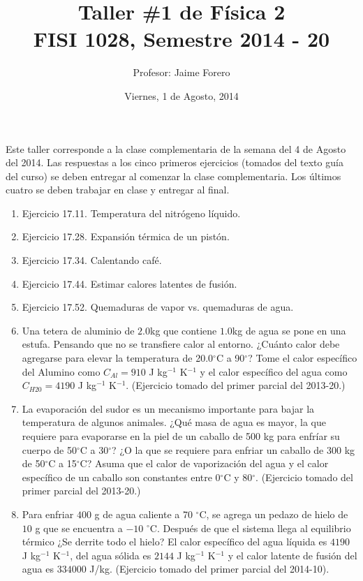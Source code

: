 \documentclass{article}
\title{Taller \#1 de F\'isica 2\\ FISI 1028, Semestre 2014 - 20}
\author{Profesor: Jaime Forero}
\date{Viernes, 1 de Agosto, 2014}
\begin{document}
\maketitle
\thispagestyle{empty}

\noindent
Este taller corresponde a la clase complementaria de la semana
del 4 de Agosto del 2014. Las respuestas a los cinco primeros
ejercicios (tomados del texto gu\'ia del curso) se deben entregar al
comenzar la clase complementaria. Los \'ultimos cuatro se deben
trabajar en clase y entregar al final. 

\begin{enumerate}
\item{Ejercicio 17.11. Temperatura del nitr\'ogeno l\'iquido.}

\item{Ejercicio 17.28. Expansi\'on t\'ermica de un pist\'on.} 

\item{Ejercicio 17.34. Calentando caf\'e.}

\item{Ejercicio 17.44. Estimar calores latentes de fusi\'on.}

\item{Ejercicio 17.52. Quemaduras de vapor vs. quemaduras de agua.} 


\item{Una tetera de aluminio de $2.0$kg que contiene $1.0$kg de agua se pone
  en una estufa. Pensando que no se transfiere calor al entorno. ¿Cuánto
  calor debe agregarse para elevar la temperatura de 20.0$^{\circ}$C a
  90$^{\circ}$? Tome el calor espec\'ifico del Alumino como
  $C_{Al}=910$ J kg$^{-1}$ K$^{-1}$ y el calor espec\'ifico del agua
  como $C_{H20}=4190$ J kg$^{-1}$ K$^{-1}$. (Ejercicio tomado del primer parcial
  del 2013-20.)}

\item La evaporaci\'on del sudor es un mecanismo
  importante para bajar la temperatura de algunos animales. ¿Qué masa
  de agua es mayor, la que requiere para evaporarse en la piel de un
  caballo de 500 kg para enfríar su cuerpo de  50$^{\circ}$C a
  30$^{\circ}$? ¿O la que se requiere para enfriar un caballo de 300 kg
  de 50$^{\circ}$C a 15$^{\circ}$C? Asuma que el calor de
  vaporizaci\'on del agua y el calor espec\'ifico de un caballo son
  constantes entre 0$^{\circ}$C y 80$^{\circ}$. (Ejercicio tomado del primer
  parcial del 2013-20.)  
  
\item Para enfriar $400$ g de agua caliente a 70 $^\circ$C,
  se agrega un pedazo de hielo de $10$ g que se encuentra a $-10$
  $^{\circ}$C. Despu\'es de que el sistema llega al equilibrio
  t\'ermico ¿Se
  derrite todo el hielo? El calor espec\'ifico
  del agua l\'iquida es $4190$ J kg$^{-1}$ K$^{-1}$, del agua
  s\'olida es $2144$ J kg$^{-1}$ K$^{-1}$ y el calor latente de
  fusi\'on del agua es $334000$ J/kg. (Ejercicio tomado del primer
  parcial del 2014-10).  


\end{enumerate}
\end{document}
